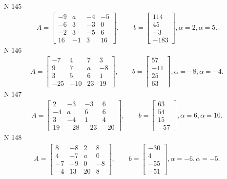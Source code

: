 \documentclass[11pt]{report}
\begin{document}
N 145
\begin{align*}
 A = \left[\begin{matrix}-9 & a & -4 & -5\\-6 & 3 & -3 & 0\\-2 & 3 & -5 & 6\\16 & -1 & 3 & 16\end{matrix}\right],
    \qquad b = \left[\begin{matrix}114\\45\\-3\\-183\end{matrix}\right], \alpha = 2, \alpha = 5. 
 \end{align*}
N 146
\begin{align*}
 A = \left[\begin{matrix}-7 & 4 & 7 & 3\\9 & 7 & a & -8\\3 & 5 & 6 & 1\\-25 & -10 & 23 & 19\end{matrix}\right],
    \qquad b = \left[\begin{matrix}57\\-11\\25\\63\end{matrix}\right], \alpha = -8, \alpha = -4. 
 \end{align*}
N 147
\begin{align*}
 A = \left[\begin{matrix}2 & -3 & -3 & 6\\-4 & a & 6 & 6\\3 & -4 & 1 & 4\\19 & -28 & -23 & -20\end{matrix}\right],
    \qquad b = \left[\begin{matrix}63\\54\\15\\-57\end{matrix}\right], \alpha = 6, \alpha = 10. 
 \end{align*}
N 148
\begin{align*}
 A = \left[\begin{matrix}8 & -8 & 2 & 8\\4 & -7 & a & 0\\-7 & -9 & 0 & -8\\-4 & 13 & 20 & 8\end{matrix}\right],
    \qquad b = \left[\begin{matrix}-30\\4\\-55\\-51\end{matrix}\right], \alpha = -6, \alpha = -5. 
 \end{align*}
\end{document}
